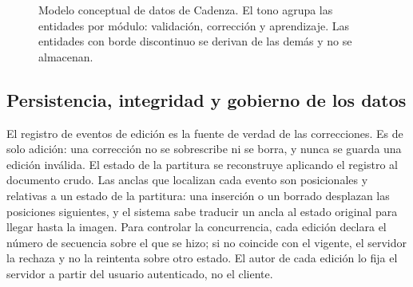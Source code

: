 \documentclass[conference]{IEEEtran}
\begin{document}
\begin{figure}[!t]
    \caption{Modelo conceptual de datos de Cadenza. El tono agrupa las entidades por módulo: validación, corrección y aprendizaje. Las entidades con borde discontinuo se derivan de las demás y no se almacenan.}
    \label{fig:modelo-conceptual-datos}
\end{figure}

\subsection{Persistencia, integridad y gobierno de los datos}

El registro de eventos de edición es la fuente de verdad de las
correcciones. Es de solo adición: una corrección no se sobrescribe ni se
borra, y nunca se guarda una edición inválida. El estado de la partitura
se reconstruye aplicando el registro al documento crudo.
Las anclas que localizan cada evento son posicionales y relativas a un
estado de la partitura: una inserción o un borrado desplazan las
posiciones siguientes, y el sistema sabe traducir un ancla al estado
original para llegar hasta la imagen. Para controlar la concurrencia, cada
edición declara el número de secuencia sobre el que se hizo; si no
coincide con el vigente, el servidor la rechaza y no la reintenta sobre
otro estado. El autor de cada edición lo fija el servidor a partir del
usuario autenticado, no el cliente.
\end{document}

